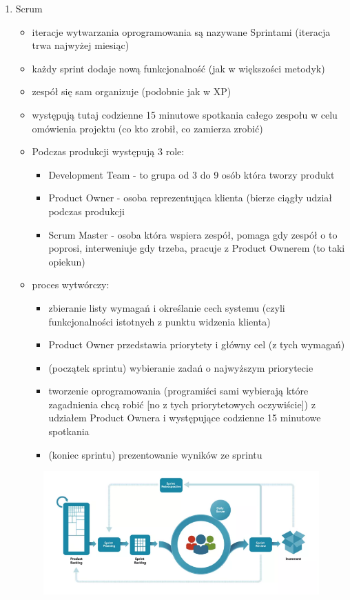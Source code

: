 \documentclass[a4paper,12pt,oneside]{book}
\begin{document}
\begin{enumerate}
					\item Scrum
					\begin{itemize}
						\item iteracje wytwarzania oprogramowania są nazywane Sprintami (iteracja trwa
						najwyżej miesiąc)
						\item każdy sprint dodaje nową funkcjonalność (jak w większości metodyk)
						\item zespół się sam organizuje (podobnie jak w XP)
						\item występują tutaj codzienne 15 minutowe spotkania całego zespołu w celu
						omówienia projektu (co kto zrobił, co zamierza zrobić)
						\item Podczas produkcji występują 3 role:
						\begin{itemize}
							\item Development Team - to grupa od 3 do 9 osób która tworzy produkt
							\item Product Owner - osoba reprezentująca klienta (bierze ciągły udział
							podczas produkcji
							\item Scrum Master - osoba która wspiera zespół, pomaga gdy zespół o to
							poprosi, interweniuje gdy trzeba, pracuje z Product Ownerem (to taki
							opiekun)
						\end{itemize}
						\item proces wytwórczy:
						\begin{itemize}
							\item zbieranie listy wymagań i określanie cech systemu (czyli
							funkcjonalności istotnych z punktu widzenia klienta)
							\item Product Owner przedstawia priorytety i główny cel (z tych wymagań)
							\item (początek sprintu) wybieranie zadań o najwyższym priorytecie
							\item tworzenie oprogramowania (programiści sami wybierają które
							zagadnienia chcą robić [no z tych priorytetowych oczywiście]) z
							udziałem Product Ownera i występujące codzienne 15 minutowe
							spotkania
							\item (koniec sprintu) prezentowanie wyników ze sprintu
						\end{itemize}
					\end{itemize}
				\begin{figure}[h!]
					\centering\includegraphics[scale=0.7]{scrum.png}

\end{figure}
\end{enumerate}
\end{document}
